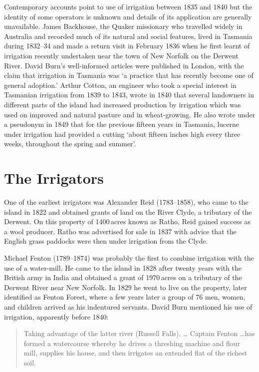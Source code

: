 Contemporary accounts point to use of irrigation between 1835 and 1840
but the identity of some operators is unknown and details of its
application are generally unavailable.  James
Backhouse, the Quaker missionary who travelled
widely in Australia and recorded much of its natural and social
features, lived in Tasmania during 1832--34 and made a return visit in
February 1836 when he first learnt of irrigation recently undertaken
near the town of New Norfolk on the Derwent
River. David Burn's well-informed
articles
\citep{burn1840} were published in London, with the claim that
irrigation in Tasmania was `a practice that has recently become one of
general adoption.'  Arthur Cotton, an engineer who
took a special interest in Tasmanian irrigation from 1839 to 1843,
wrote in 1840 that several landowners in different parts of the island
had increased production by irrigation which was used on improved and
natural pasture and in wheat-growing.  He also wrote under a pseudonym
in 1849 that for the previous fifteen years in Tasmania,
lucerne under irrigation had provided a cutting `about
fifteen inches high every three weeks, throughout the spring and
summer'.

\section*{The Irrigators}

One of the earliest irrigators was Alexander Reid
(1783--1858), who came to the island in 1822 and obtained grants of
land on the River Clyde, a tributary of the
Derwent. On this property of 1400\,acres known as Ratho,
Reid gained success as a wool producer.  Ratho was advertised for sale
in 1837 with advice that the English grass paddocks were then under
irrigation from the Clyde.

Michael Fenton (1789--1874) was probably the first
to combine irrigation with the use of a water-mill.
 He came to the
island in 1828 after twenty years with the British army in India and
obtained a grant of 1970\,acres on a tributary of the Derwent River
near New Norfolk.\index{New Norfolk, Tas.} In 1829 he went to live on
the property, later identified as Fenton Forest, where a few years
later a group of 76 men, women, and children arrived as his indentured
servants.  David Burn mentioned his use of irrigation, apparently
before 1840:
\begin{quote}
	Taking advantage of the latter river (Russell Falls), \ldots
	Captain Fenton \ldots has formed a watercourse whereby he
	drives a threshing machine and flour mill, supplies his house,
	and then irrigates an extended flat of the richest
	soil.
\end{quote}

